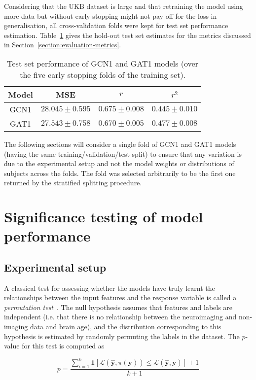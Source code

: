 Considering that the UKB dataset is large and that retraining the model using more data but without early stopping might not pay off for the loss in generalisation, all cross-validation folds were kept for test set performance estimation. Table~\ref{table:test-performance} gives the hold-out test set estimates for the metrics discussed in Section~\ref{section:evaluation-metrics}.

\begin{table}[h]
    \caption{Test set performance of GCN1 and GAT1 models (over the five early stopping folds of the training set).}\label{table:test-performance}
    \centering
    \small
    \begin{tabular}{cccc}
        \hline
    \textbf{Model} & MSE & $r$ & $r^2$ \\  \hline
        GCN1 & $28.045 \pm 0.595$ & $0.675 \pm 0.008$ & $0.445 \pm 0.010$ \\
        GAT1 & $27.543 \pm 0.758$ & $0.670 \pm 0.005$ & $0.477 \pm 0.008$ \\ \hline
\end{tabular}
\end{table}

The following sections will consider a single fold of GCN1 and GAT1 models (having the same training/validation/test split) to ensure that any variation is due to the experimental setup and not the model weights or distributions of subjects across the folds. The fold was selected arbitrarily to be the first one returned by the stratified splitting procedure.

\section{Significance testing of model performance}
\subsection{Experimental setup}
A classical test for assessing whether the models have truly learnt the relationships between the input features and the response variable is called a \textit{permutation test}~\cite{ojala2010permutation}. The null hypothesis assumes that features and labels are independent (i.e. that there is no relationship between the neuroimaging and non-imaging data and brain age), and the distribution corresponding to this hypothesis is estimated by randomly permuting the labels in the dataset. The $p$-value for this test is computed as

\begin{equation}
    p = \frac{\sum_{i=1}^k \mathbf{1}\left[\mathcal{L}(\mathbf{\hat{y}}, \pi(\mathbf{y})) \leq \mathcal{L}(\mathbf{\hat{y}}, \mathbf{y})\right] + 1}{k+1}\label{eq:p-value}
\end{equation}

